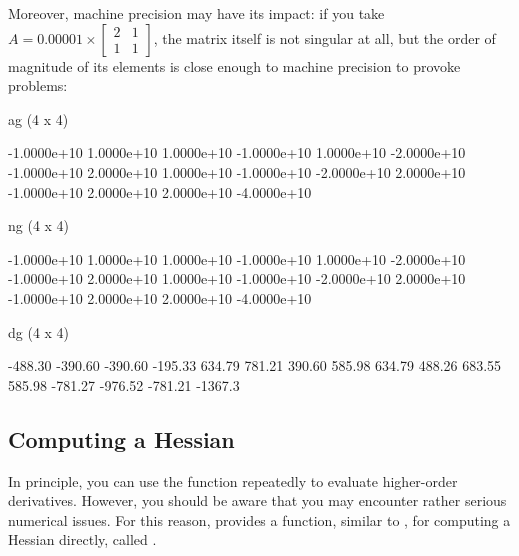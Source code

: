 Moreover, machine precision may have its impact: if you take $A =
0.00001 \times \left[\begin{array}{cc} 2 & 1\\ 1 &
    1 \end{array}\right]$, the matrix itself is not singular at
all, but the order of magnitude of its elements is close enough to
machine precision to provoke problems:
\begin{code}
ag (4 x 4)

 -1.0000e+10   1.0000e+10   1.0000e+10  -1.0000e+10 
  1.0000e+10  -2.0000e+10  -1.0000e+10   2.0000e+10 
  1.0000e+10  -1.0000e+10  -2.0000e+10   2.0000e+10 
 -1.0000e+10   2.0000e+10   2.0000e+10  -4.0000e+10 

ng (4 x 4)

 -1.0000e+10   1.0000e+10   1.0000e+10  -1.0000e+10 
  1.0000e+10  -2.0000e+10  -1.0000e+10   2.0000e+10 
  1.0000e+10  -1.0000e+10  -2.0000e+10   2.0000e+10 
 -1.0000e+10   2.0000e+10   2.0000e+10  -4.0000e+10 

dg (4 x 4)

     -488.30      -390.60      -390.60      -195.33 
      634.79       781.21       390.60       585.98 
      634.79       488.26       683.55       585.98 
     -781.27      -976.52      -781.21      -1367.3 
\end{code}

\subsection{Computing a Hessian}
\label{sec:Hessian}

In principle, you can use the  function repeatedly to
evaluate higher-order derivatives. However, you should be aware that
you may encounter rather serious numerical issues. For this reason,
 provides a function, similar to , for computing
a Hessian directly, called .


